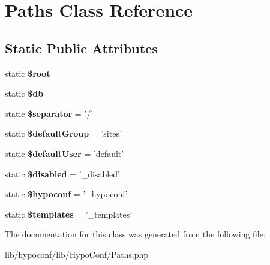 \hypertarget{class_hypo_conf_1_1_paths}{
\section{\-Paths \-Class \-Reference}
\label{class_hypo_conf_1_1_paths}
}
\subsection*{\-Static \-Public \-Attributes}
\begin{DoxyCompactItemize}
\item 
\hypertarget{class_hypo_conf_1_1_paths_ab37f7c32f41c3c61ed940887453767f4}{
static {\bfseries \$root}}
\label{class_hypo_conf_1_1_paths_ab37f7c32f41c3c61ed940887453767f4}

\item 
\hypertarget{class_hypo_conf_1_1_paths_a1fa3127fc82f96b1436d871ef02be319}{
static {\bfseries \$db}}
\label{class_hypo_conf_1_1_paths_a1fa3127fc82f96b1436d871ef02be319}

\item 
\hypertarget{class_hypo_conf_1_1_paths_acb4e8e50eaf0132d1e70b8776b4ad5cc}{
static {\bfseries \$separator} = '/'}
\label{class_hypo_conf_1_1_paths_acb4e8e50eaf0132d1e70b8776b4ad5cc}

\item 
\hypertarget{class_hypo_conf_1_1_paths_af7643b4ba4cedfe78d6b7331064975ab}{
static {\bfseries \$default\-Group} = 'sites'}
\label{class_hypo_conf_1_1_paths_af7643b4ba4cedfe78d6b7331064975ab}

\item 
\hypertarget{class_hypo_conf_1_1_paths_a314071caeb2fc165a5262854c60c29b8}{
static {\bfseries \$default\-User} = 'default'}
\label{class_hypo_conf_1_1_paths_a314071caeb2fc165a5262854c60c29b8}

\item 
\hypertarget{class_hypo_conf_1_1_paths_a6c108f5b26242d862f6e51869fbfd271}{
static {\bfseries \$disabled} = '\-\_\-disabled'}
\label{class_hypo_conf_1_1_paths_a6c108f5b26242d862f6e51869fbfd271}

\item 
\hypertarget{class_hypo_conf_1_1_paths_a04fe9418d319f8e287c0af633cac8baa}{
static {\bfseries \$hypoconf} = '\-\_\-hypoconf'}
\label{class_hypo_conf_1_1_paths_a04fe9418d319f8e287c0af633cac8baa}

\item 
\hypertarget{class_hypo_conf_1_1_paths_a3326a7f5703016042df69801c9770b4c}{
static {\bfseries \$templates} = '\-\_\-templates'}
\label{class_hypo_conf_1_1_paths_a3326a7f5703016042df69801c9770b4c}

\end{DoxyCompactItemize}


\-The documentation for this class was generated from the following file\-:\begin{DoxyCompactItemize}
\item 
lib/hypoconf/lib/\-Hypo\-Conf/\-Paths.\-php\end{DoxyCompactItemize}
